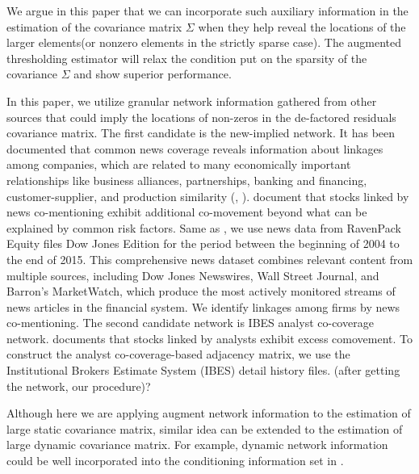 We argue in this paper that we can incorporate such auxiliary information in the estimation of the covariance matrix \(\Sigma\) when they help reveal the locations of the larger elements(or nonzero elements in the strictly sparse case). The augmented thresholding estimator will relax the condition put on the sparsity of the covariance \(\Sigma\) and show superior performance. 


In this paper, we utilize granular network information gathered from other sources that could imply the locations of non-zeros in the de-factored residuals covariance matrix. The first candidate is the new-implied network. It has been documented that common news coverage reveals information about linkages among companies, which are related to many economically important relationships like business alliances, partnerships, banking and financing, customer-supplier, and production similarity (\cite{scherbina2015economic}, \cite{schwenkler2019network}). \cite{ge2021news} document that stocks linked by news co-mentioning exhibit additional co-movement beyond what can be explained by common risk factors. Same as \cite{ge2021news}, we use news data from RavenPack Equity files Dow Jones Edition for the period between the beginning of 2004 to the end of 2015. This comprehensive news dataset combines relevant content from multiple sources, including Dow Jones Newswires, Wall Street Journal, and Barron’s  MarketWatch, which produce the most actively monitored streams of news articles in the financial system. We identify linkages among firms by news co-mentioning. The second candidate network is IBES analyst co-coverage network. \cite{israelsen2016does} documents that stocks linked by analysts exhibit excess comovement. To construct the analyst co-coverage-based adjacency matrix, we use the Institutional Brokers Estimate System (IBES) detail history files. (after getting the network, our procedure)?


Although here we are applying augment network information to the estimation of large static covariance matrix, similar idea can be extended to the estimation of large dynamic covariance matrix. For example, dynamic network information could be well incorporated into the conditioning information set in \cite{chen2019new}.

